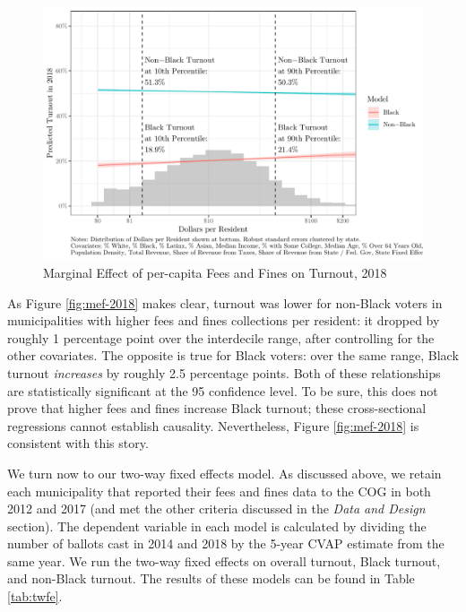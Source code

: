 \documentclass[
  12pt,
]{article}
\begin{document}
\begin{figure}[H]

{\centering \includegraphics{draft_paper_files/figure-latex/cross-18-1} 

}

\caption{\label{fig:mef-2018}Marginal Effect of per-capita Fees and Fines on Turnout, 2018}\label{fig:cross-18}
\end{figure}

As Figure \ref{fig:mef-2018} makes clear, turnout was lower for non-Black voters in municipalities with higher fees and fines collections per resident: it dropped by roughly 1 percentage point over the interdecile range, after controlling for the other covariates. The opposite is true for Black voters: over the same range, Black turnout \emph{increases} by roughly 2.5 percentage points. Both of these relationships are statistically significant at the 95 confidence level. To be sure, this does not prove that higher fees and fines increase Black turnout; these cross-sectional regressions cannot establish causality. Nevertheless, Figure \ref{fig:mef-2018} is consistent with this story.

We turn now to our two-way fixed effects model. As discussed above, we retain each municipality that reported their fees and fines data to the COG in both 2012 and 2017 (and met the other criteria discussed in the \emph{Data and Design} section). The dependent variable in each model is calculated by dividing the number of ballots cast in 2014 and 2018 by the 5-year CVAP estimate from the same year. We run the two-way fixed effects on overall turnout, Black turnout, and non-Black turnout. The results of these models can be found in Table \ref{tab:twfe}.
\end{document}
